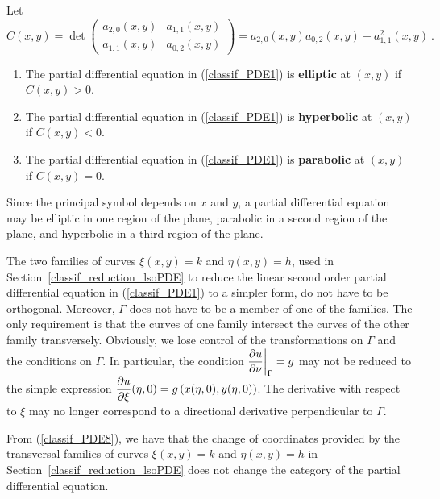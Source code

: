 \begin{defn} \label{classif_EHP}
Let
\[
C(x,y) = \det \begin{pmatrix}
a_{2,0}(x,y) & a_{1,1}(x,y) \\
a_{1,1}(x,y) & a_{0,2}(x,y)  
\end{pmatrix} = a_{2,0}(x,y)a_{0,2}(x,y) - a_{1,1}^2(x,y) \  .
\]
\begin{enumerate}
\item The partial differential equation in (\ref{classif_PDE1}) is
{\bfseries elliptic} at $(x,y)$ if $C(x,y)>0$.
\item The partial differential equation in (\ref{classif_PDE1}) is
{\bfseries hyperbolic}%
at $(x,y)$ if $C(x,y)<0$.
\item The partial differential equation in (\ref{classif_PDE1}) is
{\bfseries parabolic} at $(x,y)$ if $C(x,y)=0$. 
\end{enumerate}
\end{defn}

Since the principal symbol depends on $x$ and $y$, a partial
differential equation may be elliptic in one region of the plane,
parabolic in a second region of the plane, and hyperbolic in a third
region of the plane.

The two families of curves $\xi(x,y)=k$ and $\eta(x,y)=h$, used in
Section~\ref{classif_reduction_lsoPDE} to reduce the linear second
order partial differential equation in (\ref{classif_PDE1}) to a
simpler form, do not have to be
orthogonal.  Moreover, $\Gamma$ does not have to be a member of one of
the families.  The only requirement is that the curves of one family
intersect the curves of the other family transversely.  Obviously, we
lose control of the transformations on $\Gamma$ and the conditions
on $\Gamma$.  In particular,
the condition $\displaystyle \frac{\partial{u}}{\partial \nu}\bigg|_\Gamma = g$ may not
be reduced to the simple expression
$\displaystyle \frac{\partial{u}}{\partial \xi}(\eta,0) = g\left(x(\eta,0),y(\eta,0)\right)$.
The derivative with respect to $\xi$ may no longer correspond to a
directional derivative perpendicular to $\Gamma$.

From (\ref{classif_PDE8}), we have that the change of coordinates
provided by the transversal families of curves $\xi(x,y)=k$ and
$\eta(x,y)=h$ in Section~\ref{classif_reduction_lsoPDE} does not
change the category of the partial differential equation.

